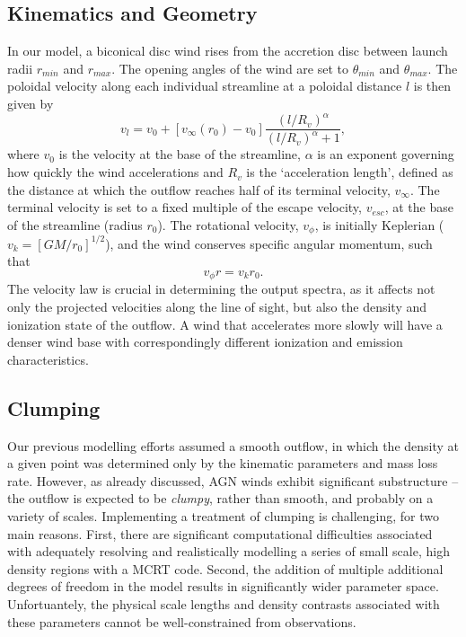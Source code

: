 \documentclass[useAMS,usenatbib]{mn2e_x}
\begin{document}
\subsection{Kinematics and Geometry}

In our model, a biconical disc wind rises from the accretion 
disc between launch radii $r_{min}$ and $r_{max}$.
The opening angles of the wind are set to $\theta_{min}$ and $\theta_{max}$.
The poloidal velocity along each individual streamline at a poloidal distance $l$ 
is then given by
\begin{equation}
v_l=v_0+\left[v_{\infty}(r_0)-v_0\right]\frac{\left(l/R_v\right)^{\alpha}}{\left(l/R_v\right)^{\alpha}+1},
\label{v_law}
\end{equation}
where $v_0$ is the velocity at the base of the streamline, $\alpha$ is
an exponent governing how quickly the wind accelerations and 
$R_v$ is the `acceleration length', defined as the distance at which
the outflow reaches half of its terminal velocity, $v_{\infty}$.
The terminal velocity is set to a fixed multiple of the escape
velocity, $v_{esc}$, at the base of the streamline (radius $r_0$).
The rotational velocity, $v_{\phi}$, is initially Keplerian ($v_k = [GM/r_0]^{1/2}$),
and the wind conserves specific angular momentum, such that 
\begin{equation}
v_{\phi} r = v_k r_0.
\label{v_law}
\end{equation}
The velocity law is crucial in determining the output spectra,
as it affects not only the projected velocities along the line of sight,
but also the density and ionization state of the outflow.
A wind that accelerates more slowly will have a denser wind base
with correspondingly different ionization and emission characteristics.

\subsection{Clumping}

Our previous modelling efforts assumed a smooth outflow, 
in which the density at a given point was determined only by the 
kinematic parameters and mass loss rate. However, as already discussed,
AGN winds exhibit significant substructure -- the outflow is expected to be
{\em clumpy}, rather than smooth, and probably on a variety of scales. 
Implementing a treatment of clumping is challenging, for
two main reasons. First, there are significant 
computational difficulties associated with adequately
resolving and realistically modelling a series of small scale, high density
regions with a MCRT code. Second, the addition of multiple additional degrees of
freedom in the model results in significantly wider parameter space.
Unfortuantely, the physical scale lengths and density contrasts 
associated with these parameters cannot be well-constrained from observations.
\end{document}
